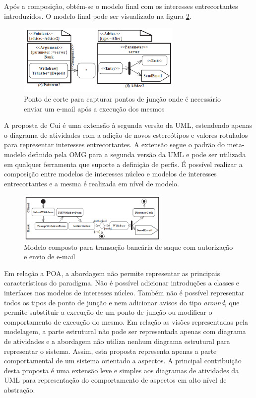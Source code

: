 Após a composição, obtém-se o modelo final com os interesses entrecortantes introduzidos. O modelo final pode ser visualizado na figura
\ref{fig:withdraw_final}.

\begin{figure}[!t]
	\centering
	\includegraphics[width=300px]{img/withdraw_2.png}
	\caption{Ponto de corte para capturar pontos de junção onde é necessário
	enviar um e-mail após a execução dos mesmos}\label{fig:withdraw_2}
\end{figure}

A proposta de Cui é uma extensão à segunda versão da UML, estendendo apenas o diagrama de atividades com a adição de novos estereótipos e valores
rotulados para representar interesses entrecortantes. A extensão segue o padrão do meta-modelo definido pela OMG para a segunda versão da UML e 
pode ser utilizada em qualquer ferramenta que suporte a definição de perfis. É possível realizar a composição entre modelos de interesses núcleo e
modelos de interesses entrecortantes e a mesma é realizada em nível de modelo.

\begin{figure}
	\centering
	\includegraphics[width=275px]{img/withdraw_final.png}
	\caption{Modelo composto para transação bancária de
	saque com autorização e envio de e-mail}\label{fig:withdraw_final}
\end{figure}

Em relação a POA, a abordagem não permite representar as principais características do paradigma. Não é possível adicionar introduções a classes e
interfaces nos modelos de interesses núcleo. Também não é possível representar todos os tipos de ponto de junção e nem adicionar avisos do tipo \textit{around}, que permite
substituir a execução de um ponto de junção ou modificar o comportamento de execução do mesmo. Em relação as visões representadas pela modelagem, a
parte estrutural não pode ser representada apenas com diagrama de atividades e a abordagem não utiliza nenhum diagrama estrutural para representar o
sistema. Assim, esta proposta representa apenas a parte comportamental de um sistema orientado a aspectos. A principal contribuição desta proposta é
uma extensão leve e simples aos diagramas de atividades da UML para representação do comportamento de aspectos em alto nível de abstração.

